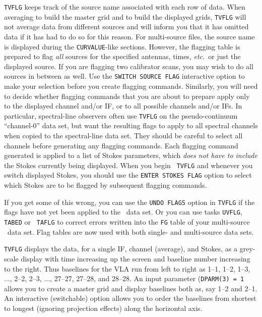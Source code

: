      {\tt TVFLG} keeps track of the source name associated with each
row of data.  When averaging to build the master grid and to build the
displayed grids, {\tt TVFLG} will not average data from different
sources and will inform you that it has omitted data if it has had to
do so for this reason.  For multi-source files, the source name is
displayed during the {\tt CURVALUE}-like sections.  However, the
flagging table is prepared to flag {\it all\/} sources for the
specified antennas, times, {\it etc.}~or just the displayed source.
If you are flagging two calibrator scans, you may wish to do all
sources in between as well.  Use the {\tt SWITCH SOURCE FLAG}
interactive option to make your selection before you create flagging
commands.  Similarly, you will need to decide whether flagging
commands that you are about to prepare apply only to the displayed
channel and/or IF, or to all possible channels and/or IFs.  In
particular, spectral-line observers often use {\tt TVFLG} on the
pseudo-continuum ``channel-0'' data set, but want the resulting flags
to apply to all spectral channels when copied to the spectral-line
data set.  They should be careful to select all channels before
generating any flagging commands.  Each flagging command generated is
applied to a list of Stokes parameters, which {\it does not have to
include\/} the Stokes currently being displayed.  When you begin {\tt
TVFLG} and whenever you switch displayed Stokes, you should use the
{\tt ENTER STOKES FLAG} option to select which Stokes are to be
flagged by subsequent flagging commands.

     If you get some of this wrong, you can use the {\tt UNDO FLAGS}
option in {\tt TVFLG} if the flags have not yet been applied to the
\uv\ data set.  Or you can use tasks {\tt UVFLG}, {\tt TABED} or {\tt
TAFLG} to correct errors written into the {\tt FG} table of your
multi-source \uv\ data set.  Flag tables are now used with both
single- and multi-source data sets.

     {\tt TVFLG} displays the data, for a single IF, channel
(average), and Stokes, as a grey-scale display with time increasing up
the screen and baseline number increasing to the right.  Thus
baselines for the VLA run from left to right as 1--1, 1--2, 1--3,
$\ldots$, 2--2, 2--3, $\ldots$, 27--27, 27--28, and 28--28.  An input
parameter ({\tt DPARM(3) = 1} allows you to create a master grid and
display baselines both as, say 1--2 and 2--1.  An interactive
(switchable) option allows you to order the baselines from shortest to
longest (ignoring projection effects) along the horizontal axis.

